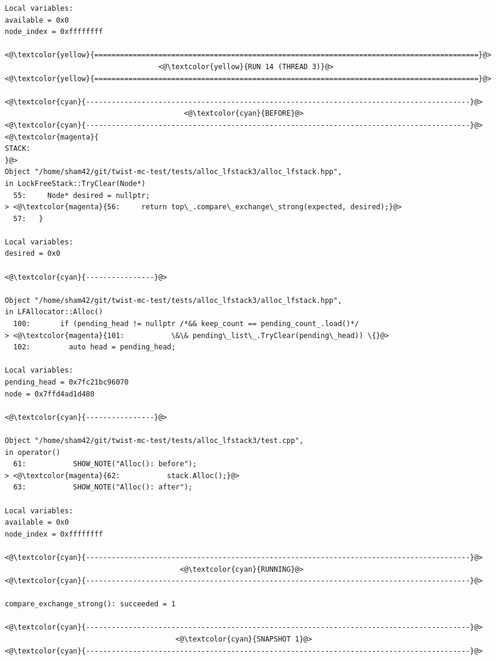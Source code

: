 \begin{adjustwidth}{-3.3cm}{-1cm}
\begin{allintypewriter}
\begin{multicols*}{2}
\begin{lstlisting}[numbers=none]
Local variables: 
available = 0x0
node_index = 0xffffffff

<@\textcolor{yellow}{==========================================================================================}@>
                                    <@\textcolor{yellow}{RUN 14 (THREAD 3)}@>
<@\textcolor{yellow}{==========================================================================================}@>

<@\textcolor{cyan}{------------------------------------------------------------------------------------------}@>
                                          <@\textcolor{cyan}{BEFORE}@>
<@\textcolor{cyan}{------------------------------------------------------------------------------------------}@>
<@\textcolor{magenta}{
STACK:
}@>
Object "/home/sham42/git/twist-mc-test/tests/alloc_lfstack3/alloc_lfstack.hpp",
in LockFreeStack::TryClear(Node*)
  55:     Node* desired = nullptr;
> <@\textcolor{magenta}{56:     return top\_.compare\_exchange\_strong(expected, desired);}@>
  57:   }

Local variables: 
desired = 0x0

<@\textcolor{cyan}{----------------}@>

Object "/home/sham42/git/twist-mc-test/tests/alloc_lfstack3/alloc_lfstack.hpp",
in LFAllocator::Alloc()
  100:       if (pending_head != nullptr /*&& keep_count == pending_count_.load()*/
> <@\textcolor{magenta}{101:           \&\& pending\_list\_.TryClear(pending\_head)) \{}@>
  102:         auto head = pending_head;

Local variables: 
pending_head = 0x7fc21bc96070
node = 0x7ffd4ad1d480

<@\textcolor{cyan}{----------------}@>

Object "/home/sham42/git/twist-mc-test/tests/alloc_lfstack3/test.cpp",
in operator()
  61:           SHOW_NOTE("Alloc(): before");
> <@\textcolor{magenta}{62:           stack.Alloc();}@>
  63:           SHOW_NOTE("Alloc(): after");

Local variables: 
available = 0x0
node_index = 0xffffffff

<@\textcolor{cyan}{------------------------------------------------------------------------------------------}@>
                                         <@\textcolor{cyan}{RUNNING}@>
<@\textcolor{cyan}{------------------------------------------------------------------------------------------}@>

compare_exchange_strong(): succeeded = 1

<@\textcolor{cyan}{------------------------------------------------------------------------------------------}@>
                                        <@\textcolor{cyan}{SNAPSHOT 1}@>
<@\textcolor{cyan}{------------------------------------------------------------------------------------------}@>


\end{lstlisting}
\end{multicols*}
\end{allintypewriter}
\end{adjustwidth}
